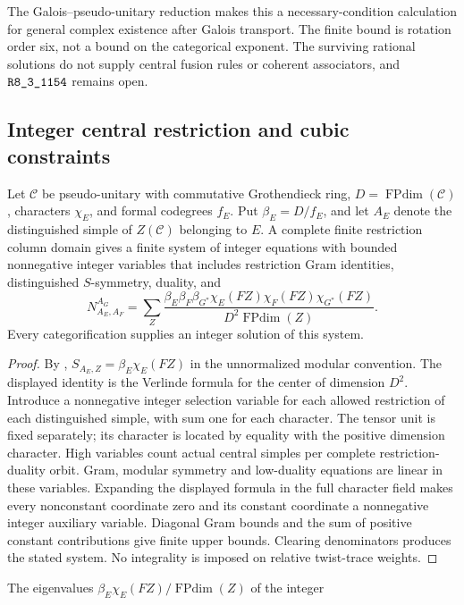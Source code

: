 The Galois--pseudo-unitary reduction makes this a necessary-condition
calculation for general complex existence after Galois transport.
The finite bound is rotation order six, not a bound on the categorical
exponent. The surviving rational solutions do not supply central fusion
rules or coherent associators, and $\sha{R8_3_1154}$ remains open.

\subsection{Integer central restriction and cubic constraints}
\begin{proposition}
Let $\mathcal C$ be pseudo-unitary with commutative Grothendieck ring,
$D=\operatorname{FPdim}(\mathcal C)$, characters $\chi_E$, and formal
codegrees $f_E$. Put $\beta_E=D/f_E$, and let $A_E$ denote the distinguished
simple of $Z(\mathcal C)$ belonging to $E$. A complete finite restriction
column domain gives a finite system of integer equations with bounded
nonnegative integer variables that includes restriction Gram identities,
distinguished $S$-symmetry, duality, and
\[
 N_{A_E,A_F}^{A_G}
 =\sum_Z\frac{\beta_E\beta_F\beta_{G^*}
 \chi_E(FZ)\chi_F(FZ)\chi_{G^*}(FZ)}{D^2\operatorname{FPdim}(Z)}.
\]
Every categorification supplies an integer solution of this system.
\end{proposition}
\begin{proof}
By \cite[Lemma~4.3 and Corollary~4.5]{DeshpandeCenter},
$S_{A_E,Z}=\beta_E\chi_E(FZ)$ in the unnormalized modular convention.
The displayed identity is the Verlinde formula for the center of dimension
$D^2$. Introduce a nonnegative integer selection variable for each allowed
restriction of each distinguished simple, with sum one for each character.
The tensor unit is fixed separately; its character is located by equality
with the positive dimension character. High variables count actual central
simples per complete restriction-duality orbit. Gram, modular symmetry and
low-duality equations are linear in these variables. Expanding the displayed
formula in the full character field makes every nonconstant coordinate zero
and its constant coordinate a nonnegative integer auxiliary variable.
Diagonal Gram bounds and the sum of positive constant contributions give
finite upper bounds. Clearing denominators produces the stated system.
No integrality is imposed on relative twist-trace weights.
\end{proof}
The eigenvalues $\beta_E\chi_E(FZ)/\operatorname{FPdim}(Z)$ of the integer

